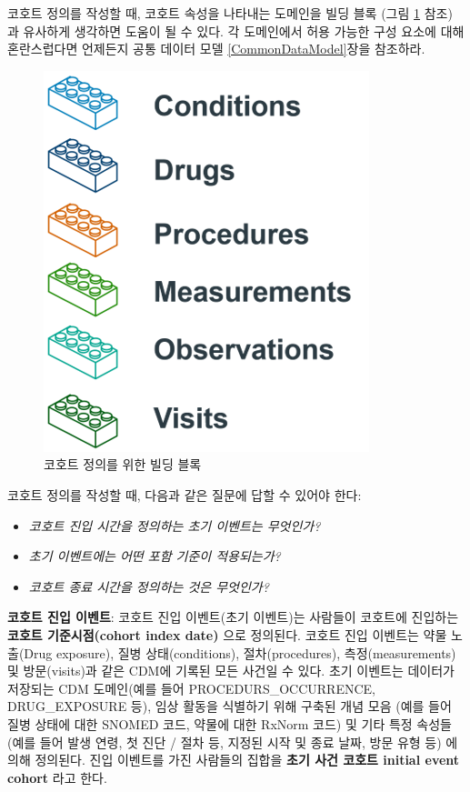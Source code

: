 \documentclass[11pt]{book}
\providecommand{\tightlist}{%
  \setlength{\itemsep}{0pt}\setlength{\parskip}{0pt}}
\theoremstyle{definition}
\theoremstyle{definition}
\theoremstyle{definition}
\theoremstyle{remark}
\begin{document}
코호트 정의를 작성할 때, 코호트 속성을 나타내는 도메인을 빌딩 블록 (그림
\ref{fig:cohortLegos} 참조) 과 유사하게 생각하면 도움이 될 수 있다. 각
도메인에서 허용 가능한 구성 요소에 대해 혼란스럽다면 언제든지 공통
데이터 모델 \ref{CommonDataModel}장을 참조하라.

\begin{figure}

{\centering \includegraphics[width=0.5\linewidth]{images/Cohorts/cohort-legos} 

}

\caption{코호트 정의를 위한 빌딩 블록}\label{fig:cohortLegos}
\end{figure}

코호트 정의를 작성할 때, 다음과 같은 질문에 답할 수 있어야 한다:

\begin{itemize}
\tightlist
\item
  \emph{코호트 진입 시간을 정의하는 초기 이벤트는 무엇인가?}
\item
  \emph{초기 이벤트에는 어떤 포함 기준이 적용되는가?}
\item
  \emph{코호트 종료 시간을 정의하는 것은 무엇인가?}
\end{itemize}

\textbf{코호트 진입 이벤트}: 코호트 진입 이벤트(초기 이벤트)는 사람들이
코호트에 진입하는 \textbf{코호트 기준시점(cohort index date)} 으로
정의된다. 코호트 진입 이벤트는 약물 노출(Drug exposure), 질병
상태(conditions), 절차(procedures), 측정(measurements) 및 방문(visits)과
같은 CDM에 기록된 모든 사건일 수 있다. 초기 이벤트는 데이터가 저장되는
CDM 도메인(예를 들어 PROCEDURS\_OCCURRENCE, DRUG\_EXPOSURE 등), 임상
활동을 식별하기 위해 구축된 개념 모음 (예를 들어 질병 상태에 대한 SNOMED
코드, 약물에 대한 RxNorm 코드) 및 기타 특정 속성들 (예를 들어 발생 연령,
첫 진단 / 절차 등, 지정된 시작 및 종료 날짜, 방문 유형 등) 에 의해
정의된다. 진입 이벤트를 가진 사람들의 집합을 \textbf{초기 사건 코호트
initial event cohort} 라고 한다. 
\end{document}
